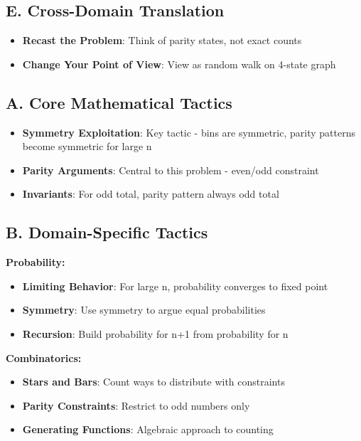 \documentclass[12pt]{article}
\begin{document}
\begin{strategicbox}
\subsection*{E. Cross-Domain Translation}
\begin{itemize}[leftmargin=*]
    \item \textbf{Recast the Problem}: Think of parity states, not exact counts
    \item \textbf{Change Your Point of View}: View as random walk on 4-state graph
\end{itemize}
\end{strategicbox}

\begin{tacticalbox}
\subsection*{A. Core Mathematical Tactics}
\begin{itemize}[leftmargin=*]
    \item \textbf{Symmetry Exploitation}: Key tactic - bins are symmetric, parity patterns become symmetric for large n
    \item \textbf{Parity Arguments}: Central to this problem - even/odd constraint
    \item \textbf{Invariants}: For odd total, parity pattern always odd total
\end{itemize}

\subsection*{B. Domain-Specific Tactics}

\textbf{Probability:}
\begin{itemize}[leftmargin=*]
    \item \textbf{Limiting Behavior}: For large n, probability converges to fixed point
    \item \textbf{Symmetry}: Use symmetry to argue equal probabilities
    \item \textbf{Recursion}: Build probability for n+1 from probability for n
\end{itemize}

\textbf{Combinatorics:}
\begin{itemize}[leftmargin=*]
    \item \textbf{Stars and Bars}: Count ways to distribute with constraints
    \item \textbf{Parity Constraints}: Restrict to odd numbers only
    \item \textbf{Generating Functions}: Algebraic approach to counting
\end{itemize}


\end{tacticalbox}
\end{document}
